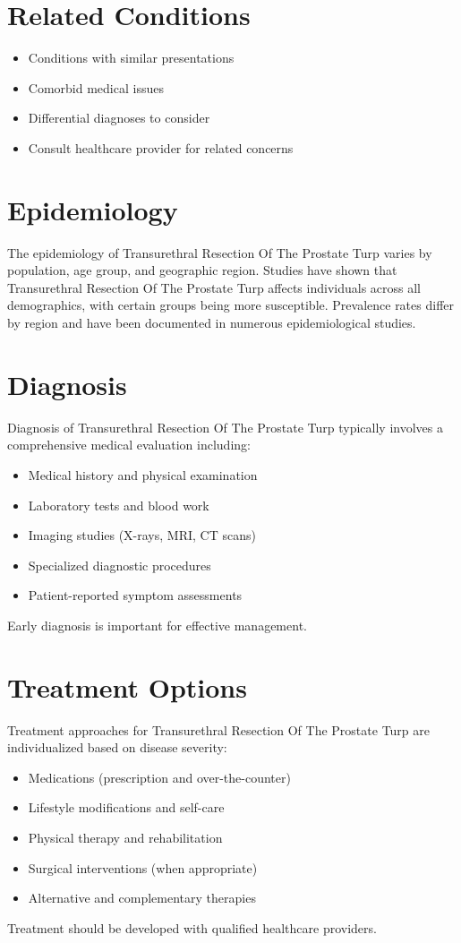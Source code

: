 \section*{Related Conditions}
\begin{itemize}
  \item Conditions with similar presentations
  \item Comorbid medical issues
  \item Differential diagnoses to consider
  \item Consult healthcare provider for related concerns
\end{itemize}

\section*{Epidemiology}
The epidemiology of Transurethral Resection Of The Prostate Turp varies by population, age group, and geographic region. Studies have shown that Transurethral Resection Of The Prostate Turp affects individuals across all demographics, with certain groups being more susceptible. Prevalence rates differ by region and have been documented in numerous epidemiological studies.

\section*{Diagnosis}
Diagnosis of Transurethral Resection Of The Prostate Turp typically involves a comprehensive medical evaluation including:
\begin{itemize}
  \item Medical history and physical examination
  \item Laboratory tests and blood work
  \item Imaging studies (X-rays, MRI, CT scans)
  \item Specialized diagnostic procedures
  \item Patient-reported symptom assessments
\end{itemize}
Early diagnosis is important for effective management.

\section*{Treatment Options}
Treatment approaches for Transurethral Resection Of The Prostate Turp are individualized based on disease severity:
\begin{itemize}
  \item Medications (prescription and over-the-counter)
  \item Lifestyle modifications and self-care
  \item Physical therapy and rehabilitation
  \item Surgical interventions (when appropriate)
  \item Alternative and complementary therapies
\end{itemize}
Treatment should be developed with qualified healthcare providers.

